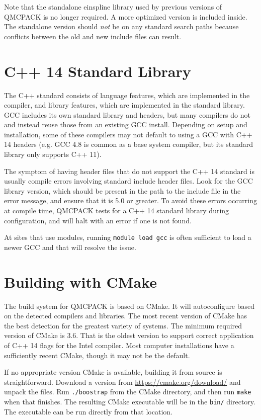 Note that the standalone einspline library used by previous versions of QMCPACK
is no longer required. A more optimized version is included
inside. The standalone version should \emph{not} be on any standard
search paths because conflicts between the old and new include files
can result.

\section{C++ 14 Standard Library}
The C++ standard consists of language features, which are implemented in the compiler, and library features, which are implemented in the standard library.
GCC includes its own standard library and headers, but many compilers do not and instead reuse those from an existing GCC install.
Depending on setup and installation, some of these compilers may not default to using a GCC with C++ 14 headers (e.g. GCC 4.8 is common as a base system compiler, but its standard library only supports C++ 11).

The symptom of having header files that do not support the C++ 14 standard is usually
compile errors involving standard include header files.
Look for the GCC library version, which should be present in the path to the include file in the error message, and ensure that it is 5.0 or greater.
To avoid these errors occurring at compile time, QMCPACK tests for a C++ 14 standard
library during configuration, and will halt with an error if one is not found.

At sites that use modules, running \texttt{module load gcc} is often sufficient to
load a newer GCC and that will resolve the issue.

\section{Building with CMake}
\label{sec:cmake}
The build system for QMCPACK is based on CMake.  It will autoconfigure
based on the detected compilers and libraries. The most recent
version of CMake has the best detection for the greatest variety of
systems.  The minimum required version of CMake is 3.6.  That is the
oldest version to support correct application of C++ 14 flags for the Intel compiler.
Most computer installations have a sufficiently recent CMake, though it may not be
the default.

If no appropriate version CMake is available, building it from source is straightforward.
Download a version from \url{https://cmake.org/download/} and unpack the files.
Run \texttt{./boostrap} from the CMake directory, and then run \texttt{make}
when that finishes.  The resulting CMake executable will be in the \texttt{bin/} directory.
The executable can be run directly from that location.


